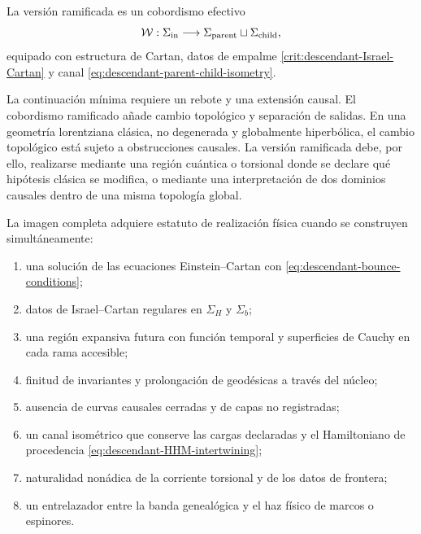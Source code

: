 \begin{definition}
\label{def:descendant-cobordism}
La versi\'on ramificada es un cobordismo efectivo
\begin{equation}
 \mathcal W:\Sigma_{\rm in}\longrightarrow
 \Sigma_{\rm parent}\sqcup\Sigma_{\rm child},
 \label{eq:descendant-cobordism}
\end{equation}
equipado con estructura de Cartan, datos de empalme
\cref{crit:descendant-Israel-Cartan} y canal
\cref{eq:descendant-parent-child-isometry}.
\end{definition}

La continuaci\'on m\'inima requiere un rebote y una extensi\'on causal. El
cobordismo ramificado a\~nade cambio topol\'ogico y separaci\'on de salidas.
En una geometr\'ia lorentziana cl\'asica, no degenerada y globalmente
hiperb\'olica, el cambio topol\'ogico est\'a sujeto a obstrucciones causales.
La versi\'on ramificada debe, por ello, realizarse mediante una regi\'on
cu\'antica o torsional donde se declare qu\'e hip\'otesis cl\'asica se modifica,
o mediante una interpretaci\'on de dos dominios causales dentro de una misma
topolog\'ia global.

\begin{criterion}
\label{crit:descendant-promotion}
La imagen completa adquiere estatuto de realizaci\'on f\'isica cuando se
construyen simult\'aneamente:
\begin{enumerate}[label=\roman*)]
 \item una soluci\'on de las ecuaciones Einstein--Cartan con
       \cref{eq:descendant-bounce-conditions};
 \item datos de Israel--Cartan regulares en \(\Sigma_H\) y \(\Sigma_b\);
 \item una regi\'on expansiva futura con funci\'on temporal y superficies de
       Cauchy en cada rama accesible;
 \item finitud de invariantes y prolongaci\'on de geod\'esicas a trav\'es del
       n\'ucleo;
 \item ausencia de curvas causales cerradas y de capas no registradas;
 \item un canal isom\'etrico que conserve las cargas declaradas y el
       Hamiltoniano de procedencia \cref{eq:descendant-HHM-intertwining};
 \item naturalidad non\'adica de la corriente torsional y de los datos de
       frontera;
 \item un entrelazador entre la banda geneal\'ogica y el haz f\'isico de
       marcos o espinores.
\end{enumerate}
\end{criterion}

